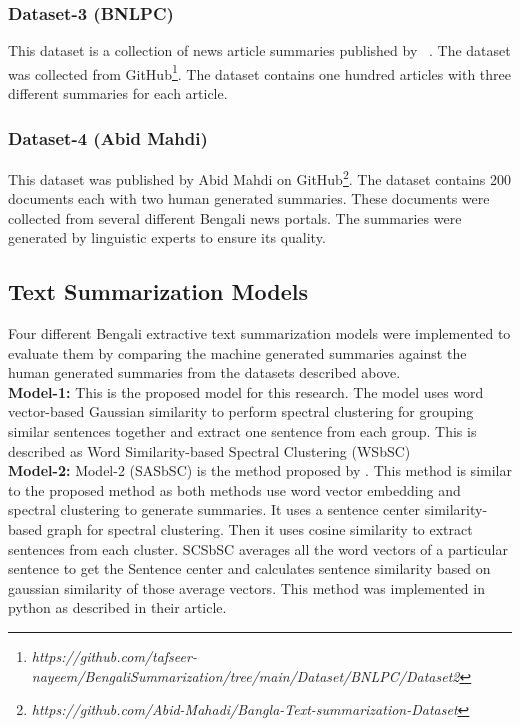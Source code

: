 \subsubsection{Dataset-3 (BNLPC)\cite{Hque-2015-BNLPC-Dataset}}
This dataset is a collection of news article summaries published by \citeauthor{Hque-2015-BNLPC-Dataset}~\cite{Hque-2015-BNLPC-Dataset}.
The dataset was collected from
GitHub\footnote{\textit{https://github.com/tafseer-nayeem/BengaliSummarization/tree/main/Dataset/BNLPC/Dataset2}}.
The dataset contains one hundred articles with three different summaries for each article.

\subsubsection{Dataset-4 (Abid Mahdi)}
This dataset was published by Abid Mahdi on
GitHub\footnote{\textit{https://github.com/Abid-Mahadi/Bangla-Text-summarization-Dataset}}.
The dataset contains 200 documents each with two human generated summaries.
These documents were collected from several different Bengali news portals.
The summaries were generated by linguistic experts to ensure its quality.

\subsection{Text Summarization Models}\label{subsec:text-summarization-models}
Four different Bengali extractive text summarization models were implemented to evaluate them by
comparing the machine generated summaries against the human generated summaries from the datasets described above.\\

\textbf{Model-1:} This is the proposed model for this research.
The model uses word vector-based Gaussian similarity to perform spectral clustering for grouping similar
sentences together and extract one sentence from each group.
This is described as Word Similarity-based Spectral Clustering (WSbSC)\\

\textbf{Model-2:} Model-2 (SASbSC) is the method proposed by \citeauthor{roychowdhury-etal-2022-spectral-base}
\cite{roychowdhury-etal-2022-spectral-base}.
This method is similar to the proposed method as both methods use word vector
embedding and spectral clustering to generate summaries.
It uses a sentence center similarity-based graph for spectral clustering.
Then it uses cosine similarity to extract sentences from each cluster.
SCSbSC averages all the word vectors of a particular sentence to get the Sentence center
and calculates sentence similarity based on gaussian similarity of those average vectors.
This method was implemented in python as described in their article.\\

